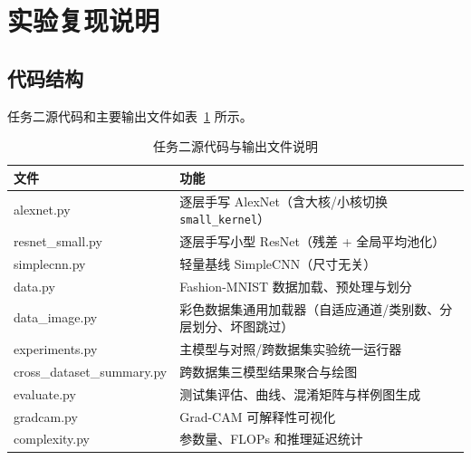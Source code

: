 \documentclass[12pt,a4paper,fontset=fandol]{ctexart}
\numberwithin{figure}{section}
\numberwithin{table}{section}
\numberwithin{equation}{section}
\begin{document}
\section{实验复现说明}

\subsection{代码结构}
任务二源代码和主要输出文件如表~\ref{tab:code} 所示。
\begin{table}[H]
  \centering
  \caption{任务二源代码与输出文件说明}
  \label{tab:code}
  \begin{tabular}{ll}
    \toprule
    文件 & 功能 \\
    \midrule
    alexnet.py & 逐层手写 AlexNet（含大核/小核切换 \texttt{small\_kernel}） \\
    resnet\_small.py & 逐层手写小型 ResNet（残差 + 全局平均池化） \\
    simplecnn.py & 轻量基线 SimpleCNN（尺寸无关） \\
    data.py & Fashion-MNIST 数据加载、预处理与划分 \\
    data\_image.py & 彩色数据集通用加载器（自适应通道/类别数、分层划分、坏图跳过） \\
    experiments.py & 主模型与对照/跨数据集实验统一运行器 \\
    cross\_dataset\_summary.py & 跨数据集三模型结果聚合与绘图 \\
    evaluate.py & 测试集评估、曲线、混淆矩阵与样例图生成 \\
    gradcam.py & Grad-CAM 可解释性可视化 \\
    complexity.py & 参数量、FLOPs 和推理延迟统计 \\
    \bottomrule
  \end{tabular}
\end{table}
\end{document}
